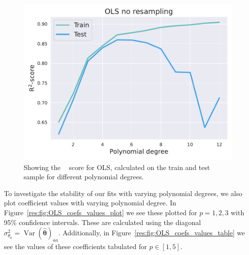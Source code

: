 \documentclass[twocolumn,english,notitlepage]{article}
\renewcommand{\vec}[1]{\boldsymbol{#1}}
\renewcommand{\var}{\operatorname{Var}}
\DeclareMathOperator{\Rsquared}{R^2}
\begin{document}
                \begin{figure}[ht]
                    \centering
                    \includegraphics[width=.9\linewidth]{OLS_r2_noresample.pdf}
                    \caption{Showing the $\Rsquared$ score for OLS, calculated on the train and test sample for different polynomial degrees.}
                    \label{res:fig:OLS_R2_noresample}
                \end{figure}

                To investigate the stability of our fits with varying polynomial degrees, we also plot coefficient values with varying polynomial degree. In Figure~\ref{res:fig:OLS_coefs_values_plot} we see these plotted for $p = 1,2,3$ with 95\% confidence intervals. These are calculated using the diagonal $\sigma^2_{\theta_a} = \var{(\vec{\hat{\theta}})_{aa}}$. Additionally, in Figure~\ref{res:fig:OLS_coefs_values_table} we see the values of these coefficients tabulated for $p \in [1,5]$.
\end{document}
